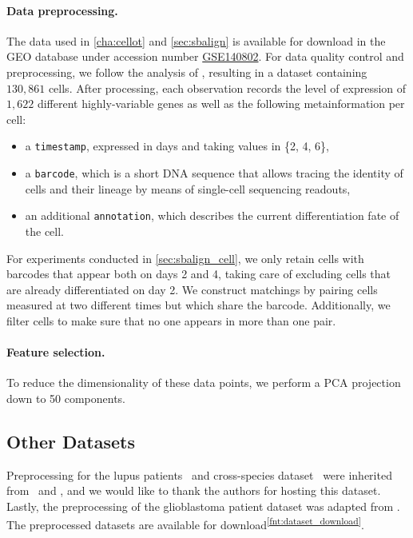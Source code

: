 \paragraph{Data preprocessing.}
The data used in \cref{cha:cellot} and \cref{sec:sbalign} is available for download in the \acrshort{GEO} database under accession number \href{https://www.ncbi.nlm.nih.gov/geo/query/acc.cgi?acc=GSE140802}{GSE140802}.
For data quality control and preprocessing, we follow the analysis of \citet{lotfollahi2021compositional}, resulting in a dataset containing $130,861$ cells.
After processing, each observation records the level of expression of $1,622$ different highly-variable genes as well as the following metainformation per cell:
\begin{itemize}
    \item a \texttt{timestamp}, expressed in days and taking values in \{2, 4, 6\},
    \item a \texttt{barcode}, which is a short DNA sequence that allows tracing the identity of cells and their lineage by means of single-cell sequencing readouts,
    \item an additional \texttt{annotation}, which describes the current differentiation fate of the cell.
\end{itemize}

For experiments conducted in \cref{sec:sbalign_cell}, we only retain cells with barcodes that appear both on days 2 and 4, taking care of excluding cells that are already differentiated on day 2.
We construct matchings by pairing cells measured at two different times but which share the barcode. 
Additionally, we filter cells to make sure that no one appears in more than one pair.

\paragraph{Feature selection.}
To reduce the dimensionality of these data points, we perform a PCA projection down to 50 components.

\subsection{Other Datasets}
\label{app:dataset_other}

Preprocessing for the lupus patients~\citep{kang2018multiplexed} and cross-species dataset~\citep{hagai2018gene} were inherited from~\citet{rybakov2020learning} 
and \citet{lotfollahi2019scgen}, and we would like to thank the authors for hosting this dataset.
Lastly, the preprocessing of the glioblastoma patient dataset \citep{zhao2021deconvolution} was adapted from \citet{peidli2022scperturb}.
The preprocessed datasets are available for download\textsuperscript{\ref{fnt:dataset_download}}.

